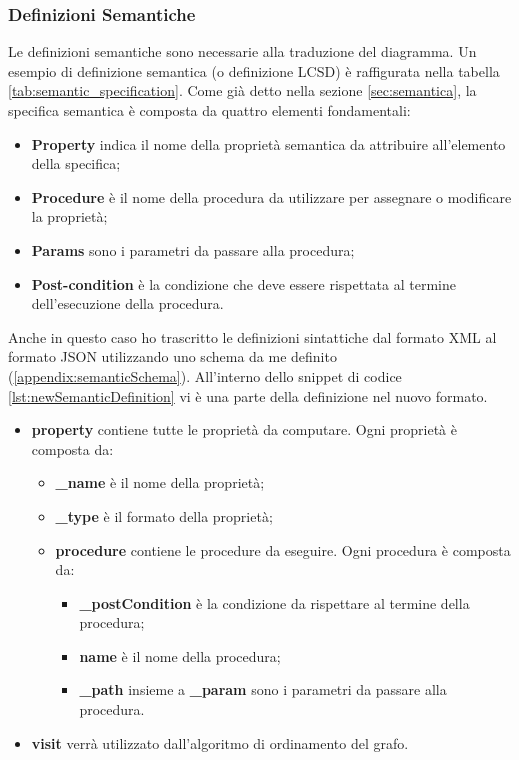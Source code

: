             \subsubsection{Definizioni Semantiche}
                Le definizioni semantiche sono necessarie alla traduzione del diagramma. Un esempio di definizione semantica (o definizione LCSD) è raffigurata nella tabella \ref{tab:semantic_specification}. Come già detto nella sezione \ref{sec:semantica}, la specifica semantica è composta da quattro elementi fondamentali: 
                \begin{itemize}
                    \item \textbf{Property} indica il nome della proprietà semantica da attribuire all'elemento della specifica;
                    \item \textbf{Procedure} è il nome della procedura da utilizzare per assegnare o modificare la proprietà;
                    \item \textbf{Params} sono i parametri da passare alla procedura;
                    \item \textbf{Post-condition} è la condizione che deve essere rispettata al termine dell'esecuzione della procedura.
                \end{itemize}
                Anche in questo caso ho trascritto le definizioni sintattiche dal formato XML al formato JSON utilizzando uno schema da me definito (\ref{appendix:semanticSchema}). All'interno dello snippet di codice \ref{lst:newSemanticDefinition} vi è una parte della definizione nel nuovo formato. 
                \begin{itemize}
                    \item \textbf{property} contiene tutte le proprietà da computare. Ogni proprietà è composta da:
                    \begin{itemize}
                        \item \textbf{\_name} è il nome della proprietà;
                        \item \textbf{\_type} è il formato della proprietà;
                        \item \textbf{procedure} contiene le procedure da eseguire. Ogni procedura è composta da:
                        \begin{itemize}
                            \item \textbf{\_postCondition} è la condizione da rispettare al termine della procedura;
                            \item \textbf{name} è il nome della procedura;
                            \item \textbf{\_path} insieme a \textbf{\_param} sono i parametri da passare alla procedura.
                        \end{itemize}
                    \end{itemize}
                    \item \textbf{visit} verrà utilizzato dall'algoritmo di ordinamento del grafo.
                \end{itemize}
